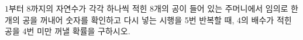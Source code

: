 $1$부터 $8$까지의 자연수가 각각 하나씩 적힌 8개의 공이 들어 있는 주머니에서 임의로 한 개의 공을 꺼내어 숫자를 확인하고 다시 넣는 시행을 5번 반복할 때, $4$의 배수가 적힌 공을 4번 미만 꺼낼 확률을 구하시오.
